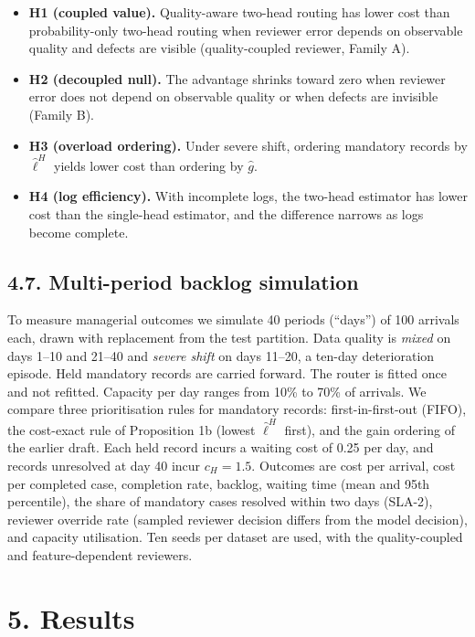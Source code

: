 \documentclass[
  11pt,
]{article}
\providecommand{\tightlist}{%
  \setlength{\itemsep}{0pt}\setlength{\parskip}{0pt}}
\begin{document}
\begin{itemize}
\tightlist
\item
  \textbf{H1 (coupled value).} Quality-aware two-head routing has lower
  cost than probability-only two-head routing when reviewer error
  depends on observable quality and defects are visible (quality-coupled
  reviewer, Family A).
\item
  \textbf{H2 (decoupled null).} The advantage shrinks toward zero when
  reviewer error does not depend on observable quality or when defects
  are invisible (Family B).
\item
  \textbf{H3 (overload ordering).} Under severe shift, ordering
  mandatory records by \(\hat\ell^H\) yields lower cost than ordering by
  \(\hat g\).
\item
  \textbf{H4 (log efficiency).} With incomplete logs, the two-head
  estimator has lower cost than the single-head estimator, and the
  difference narrows as logs become complete.
\end{itemize}

\hypertarget{multi-period-backlog-simulation}{%
\subsection{4.7. Multi-period backlog
simulation}\label{multi-period-backlog-simulation}}

To measure managerial outcomes we simulate 40 periods (``days'') of 100
arrivals each, drawn with replacement from the test partition. Data
quality is \emph{mixed} on days 1--10 and 21--40 and \emph{severe shift}
on days 11--20, a ten-day deterioration episode. Held mandatory records
are carried forward. The router is fitted once and not refitted.
Capacity per day ranges from 10\% to 70\% of arrivals. We compare three
prioritisation rules for mandatory records: first-in-first-out (FIFO),
the cost-exact rule of Proposition 1b (lowest \(\hat\ell^H\) first), and
the gain ordering of the earlier draft. Each held record incurs a
waiting cost of 0.25 per day, and records unresolved at day 40 incur
\(c_H=1.5\). Outcomes are cost per arrival, cost per completed case,
completion rate, backlog, waiting time (mean and 95th percentile), the
share of mandatory cases resolved within two days (SLA-2), reviewer
override rate (sampled reviewer decision differs from the model
decision), and capacity utilisation. Ten seeds per dataset are used,
with the quality-coupled and feature-dependent reviewers.

\hypertarget{results}{%
\section{5. Results}\label{results}}
\end{document}
